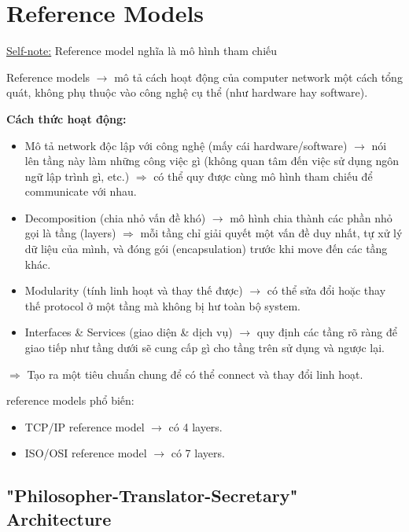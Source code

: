\section{Reference Models}

\noindent
\underline{Self-note:} Reference model nghĩa là mô hình tham chiếu 
\medskip

\noindent
Reference models $\rightarrow$ mô tả cách hoạt động của computer network một cách tổng quát, không phụ thuộc vào công nghệ cụ thể (như hardware hay software).
\medskip

\noindent
\textbf{Cách thức hoạt động:}

\begin{itemize}
    \item Mô tả network độc lập với công nghệ (mấy cái hardware/software) $\rightarrow$ nói lên tầng này làm những công việc gì (không quan tâm đến việc sử dụng ngôn ngữ lập trình gì, etc.) $\Rightarrow$ có thể quy được cùng mô hình tham chiếu để communicate với nhau.
    \item Decomposition (chia nhỏ vấn đề khó) $\rightarrow$ mô hình chia thành các phần nhỏ gọi là tầng (layers) $\Rightarrow$ mỗi tầng chỉ giải quyết một vấn đề duy nhất, tự xử lý dữ liệu của mình, và đóng gói (encapsulation) trước khi move đến các tầng khác.
    \item Modularity (tính linh hoạt và thay thế được) $\rightarrow$ có thể sửa đổi hoặc thay thế protocol ở một tầng mà không bị hư toàn bộ system.
    \item Interfaces \& Services (giao diện \& dịch vụ) $\rightarrow$ quy định các tầng rõ ràng để giao tiếp như tầng dưới sẽ cung cấp gì cho tầng trên sử dụng và ngược lại.
\end{itemize}
\medskip

\noindent
$\Rightarrow$ Tạo ra một tiêu chuẩn chung để có thể connect và thay đổi linh hoạt.
\medskip

\vspace{0.2cm}

 reference models phổ biến:

\begin{itemize}
    \item TCP/IP reference model $\rightarrow$ có 4 layers.
    \item ISO/OSI reference model $\rightarrow$ có 7 layers.
\end{itemize}
\medskip

\subsection{"Philosopher-Translator-Secretary" Architecture}

